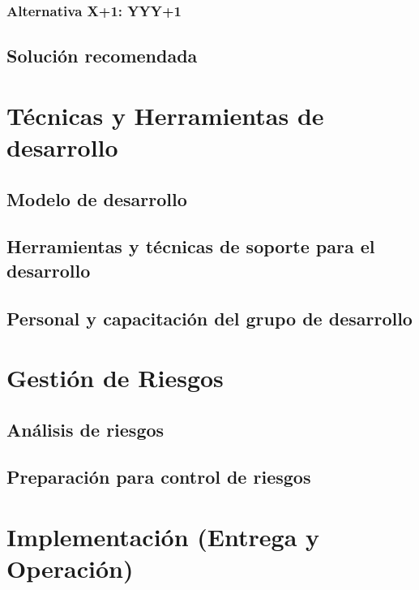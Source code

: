 \documentclass[letterpaper,spanish,10pt]{article}
\begin{document}
\subsubsection{Alternativa X+1: YYY+1}



\subsection{Soluci\'on recomendada}



\section{T\'ecnicas y Herramientas de desarrollo}
\subsection{Modelo de desarrollo}



\subsection{Herramientas y t\'ecnicas de soporte para el desarrollo}



\subsection{Personal y capacitaci\'on del grupo de desarrollo}



\section{Gesti\'on de Riesgos}
\subsection{An\'alisis de riesgos}



\subsection{Preparaci\'on para control de riesgos}



\section{Implementaci\'on (Entrega y Operaci\'on)}
\end{document}
